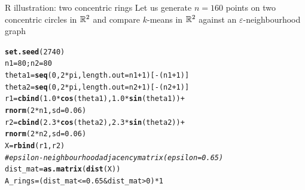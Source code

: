 \documentclass[aspectratio=169]{beamer}\usepackage[]{graphicx}\usepackage[]{xcolor}
\makeatletter
\newcommand{\hlnum}[1]{\textcolor[rgb]{0.686,0.059,0.569}{#1}}%
\newcommand{\hlcom}[1]{\textcolor[rgb]{0.678,0.584,0.686}{\textit{#1}}}%
\newcommand{\hlopt}[1]{\textcolor[rgb]{0,0,0}{#1}}%
\newcommand{\hldef}[1]{\textcolor[rgb]{0.345,0.345,0.345}{#1}}%
\newcommand{\hlkwb}[1]{\textcolor[rgb]{0.69,0.353,0.396}{#1}}%
\newcommand{\hlkwc}[1]{\textcolor[rgb]{0.333,0.667,0.333}{#1}}%
\newcommand{\hlkwd}[1]{\textcolor[rgb]{0.737,0.353,0.396}{\textbf{#1}}}%
\newenvironment{kframe}{%
 \def\at@end@of@kframe{}%
 \ifinner\ifhmode%
  \def\at@end@of@kframe{\end{minipage}}%
  \begin{minipage}{\columnwidth}%
 \fi\fi%
 \def\FrameCommand##1{\hskip\@totalleftmargin \hskip-\fboxsep
 \colorbox{shadecolor}{##1}\hskip-\fboxsep
     \hskip-\linewidth \hskip-\@totalleftmargin \hskip\columnwidth}%
 \MakeFramed {\advance\hsize-\width
   \@totalleftmargin\z@ \linewidth\hsize
   \@setminipage}}%
 {\par\unskip\endMakeFramed%
 \at@end@of@kframe}
\newenvironment{knitrout}{}{} %
\makeatother
\begin{document}
\begin{frame}[fragile]{R illustration: two concentric rings}
Let us generate $n = 160$ points on two concentric circles in $\mathbb{R}^2$ and compare $k$-means in $\mathbb{R}^2$ against an $\varepsilon$-neighbourhood graph
\vfill
\begin{knitrout}
\color{fgcolor}\begin{kframe}
\begin{alltt}
\hlkwd{set.seed}\hldef{(}\hlnum{2740}\hldef{)}
\hldef{n1} \hlkwb{=} \hlnum{80}\hldef{; n2} \hlkwb{=} \hlnum{80}
\hldef{theta1} \hlkwb{=} \hlkwd{seq}\hldef{(}\hlnum{0}\hldef{,} \hlnum{2} \hlopt{*} \hldef{pi,} \hlkwc{length.out} \hldef{= n1} \hlopt{+} \hlnum{1}\hldef{)[}\hlopt{-}\hldef{(n1} \hlopt{+} \hlnum{1}\hldef{)]}
\hldef{theta2} \hlkwb{=} \hlkwd{seq}\hldef{(}\hlnum{0}\hldef{,} \hlnum{2} \hlopt{*} \hldef{pi,} \hlkwc{length.out} \hldef{= n2} \hlopt{+} \hlnum{1}\hldef{)[}\hlopt{-}\hldef{(n2} \hlopt{+} \hlnum{1}\hldef{)]}
\hldef{r1} \hlkwb{=} \hlkwd{cbind}\hldef{(}\hlnum{1.0} \hlopt{*} \hlkwd{cos}\hldef{(theta1),} \hlnum{1.0} \hlopt{*} \hlkwd{sin}\hldef{(theta1))} \hlopt{+}
  \hlkwd{rnorm}\hldef{(}\hlnum{2} \hlopt{*} \hldef{n1,} \hlkwc{sd} \hldef{=} \hlnum{0.06}\hldef{)}
\hldef{r2} \hlkwb{=} \hlkwd{cbind}\hldef{(}\hlnum{2.3} \hlopt{*} \hlkwd{cos}\hldef{(theta2),} \hlnum{2.3} \hlopt{*} \hlkwd{sin}\hldef{(theta2))} \hlopt{+}
  \hlkwd{rnorm}\hldef{(}\hlnum{2} \hlopt{*} \hldef{n2,} \hlkwc{sd} \hldef{=} \hlnum{0.06}\hldef{)}
\hldef{X} \hlkwb{=} \hlkwd{rbind}\hldef{(r1, r2)}
\hlcom{# epsilon-neighbourhood adjacency matrix (epsilon = 0.65)}
\hldef{dist_mat} \hlkwb{=} \hlkwd{as.matrix}\hldef{(}\hlkwd{dist}\hldef{(X))}
\hldef{A_rings} \hlkwb{=} \hldef{(dist_mat} \hlopt{<=} \hlnum{0.65} \hlopt{&} \hldef{dist_mat} \hlopt{>} \hlnum{0}\hldef{)} \hlopt{*} \hlnum{1}
\end{alltt}
\end{kframe}
\end{knitrout}
\end{frame}







\end{document}
